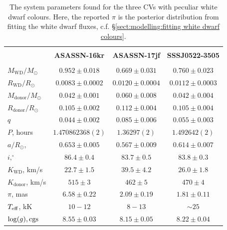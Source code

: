 \begin{landscape}
    \begin{table}
        \centering
        \caption{The system parameters found for the three CVs with peculiar white dwarf colours. Here, the reported $\pi$ is the posterior distribution from fitting the white dwarf fluxes, c.f. \S\ref{sect:modelling:fitting white dwarf colours}.}
        \label{appendix:table:three white dwarfs:system_parameters}
        \begin{tabular}{lccc}
            \hline \\
            ~                          & \textbf{ASASSN-16kr}    & \textbf{ASASSN-17jf}  & \textbf{SSSJ0522-3505} \\
            \hline \hline \\
            $M_\mathrm{WD}/M_\odot$    & $0.952\pm0.018$         & $0.669\pm0.031$        & $0.760\pm0.023$ \\
            $R_\mathrm{WD}/R_\odot$    & $0.0083\pm0.0002$       & $0.0120\pm0.0004$      & $0.0112\pm0.0003$ \\
            $M_\mathrm{donor}/M_\odot$ & $0.042\pm0.001$         & $0.060\pm0.008$        & $0.042\pm0.004$ \\
            $R_\mathrm{donor}/R_\odot$ & $0.105\pm0.002$         & $0.112\pm0.004$        & $0.105\pm0.004$ \\
            $q$                        & $0.044\pm0.002$         & $0.085\pm0.006$        & $0.055\pm0.003$ \\
            \hline
            $P$, hours                 & $1.470862368(2)$        & $1.36297(2)$           & $1.492642(2)$ \\
            $a/R_\odot$,               & $0.653\pm0.005$         & $0.567\pm0.009$        & $0.614\pm0.007$  \\
            $i, ^\circ$                & $86.4\pm0.4$            & $83.7\pm0.5$           & $83.8\pm0.3$  \\
            $K_\mathrm{WD}$, km/s      & $22.7\pm1.5$            & $39.5\pm4.2$           & $26.0\pm1.8$  \\
            $K_\mathrm{donor}$, km/s   & $515\pm3$               & $462\pm5$              & $470\pm4$  \\
            \hline
            $\pi$, mas                 & $6.58\pm0.22$           & $2.09\pm0.19$          & $1.81\pm0.11$  \\
            $T_{\rm eff}$, kK          & $10-12$                 & $8-13$                 & $\sim25$  \\
            $\log(g), {\rm cgs}$       & $8.55\pm0.03$           & $8.15\pm0.05$          & $8.22\pm0.04$  \\
            \hline
            \hline
        \end{tabular}
    \end{table}



\end{landscape}

